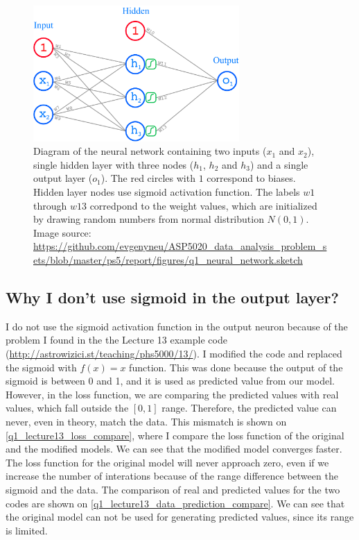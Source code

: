 \begin{figure}[!ht]
  \centering
  \includegraphics[width=0.7\textwidth]{figures/q1_neural_network.pdf}
  \caption{Diagram of the neural network containing two inputs ($x_1$ and $x_2$), single hidden layer with three nodes ($h_1$, $h_2$ and $h_3$) and a single output layer ($o_1$). The red circles with $1$ correspond to biases. Hidden layer nodes use sigmoid activation function. The labels $w1$ through $w13$ corredpond to the weight values, which are initialized by drawing random numbers from normal distribution $N(0, 1)$. Image source: \url{https://github.com/evgenyneu/ASP5020_data_analysis_problem_sets/blob/master/ps5/report/figures/q1_neural_network.sketch}}
  \label{q1_network_diagram}
\end{figure}


\subsection{Why I don't use sigmoid in the output layer?}

I do not use the sigmoid activation function in the output neuron because of the problem I found in the the Lecture 13 example code (\url{http://astrowizici.st/teaching/phs5000/13/}). I modified the code and replaced the sigmoid with $f(x) = x$ function. This was done because the output of the sigmoid is between 0 and 1, and it is used as predicted value from our model. However, in the loss function, we are comparing the predicted values with real values, which fall outside the $[0, 1]$ range. Therefore, the predicted value can never, even in theory, match the data. This mismatch is shown on \autoref{q1_lecture13_loss_compare}, where I compare the loss function of the original and the modified models. We can see that the modified model converges faster. The loss function for the original model will never approach zero, even if we increase the number of interations because of the range difference between the sigmoid and the data. The comparison of real and predicted values for the two codes are shown on \autoref{q1_lecture13_data_prediction_compare}. We can see that the original model can not be used for generating predicted values, since its range is limited.

